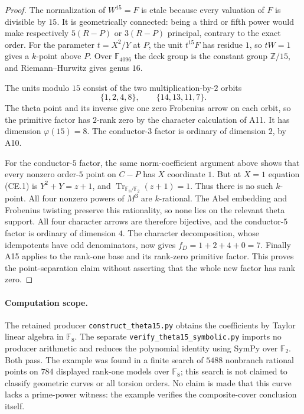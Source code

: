 \begin{proof}
The normalization of $W^{15}=F$ is etale because every valuation
of $F$ is divisible by $15$. It is geometrically connected:
being a third or fifth power would make respectively
$5(R-P)$ or $3(R-P)$ principal, contrary to the exact order.
For the parameter $t=X^2/Y$ at $P$, the unit $t^{15}F$ has residue
$1$, so $tW=1$ gives a $k$-point above $P$. Over
$\mathbb F_{4096}$ the deck group is the constant group
$\mathbb Z/15$, and Riemann--Hurwitz gives genus $16$.

The units modulo $15$ consist of the two multiplication-by-$2$
orbits
\[
                \{1,2,4,8\},\qquad\{14,13,11,7\}.
\]
The theta point and its inverse give one zero Frobenius arrow on
each orbit, so the primitive factor has $2$-rank zero by the
character calculation of A11. It has dimension $\varphi(15)=8$.
The conductor-$3$ factor is ordinary of dimension $2$, by A10.

For the conductor-$5$ factor, the same norm-coefficient argument
above shows that every nonzero order-$5$ point on $C-P$ has
$X$ coordinate $1$. But at $X=1$ equation (CE.1) is
$Y^2+Y=z+1$, and $\operatorname{Tr}_{\mathbb F_8/\mathbb F_2}(z+1)=1$.
Thus there is no such $k$-point. All four nonzero powers of
$M^3$ are $k$-rational. The Abel embedding and Frobenius twisting
preserve this rationality, so none lies on the relevant theta
support. All four character arrows are therefore bijective, and
the conductor-$5$ factor is ordinary of dimension $4$.
The character decomposition, whose idempotents have odd
denominators, now gives
$f_D=1+2+4+0=7$. Finally A15 applies to the rank-one base and its
rank-zero primitive factor. This proves the point-separation claim
without asserting that the whole new factor has rank zero.
\end{proof}

\paragraph{Computation scope.}
The retained producer \texttt{construct\_theta15.py} obtains the
coefficients by Taylor linear algebra in $\mathbb F_8$.
The separate \texttt{verify\_theta15\_symbolic.py} imports no
producer arithmetic and reduces the polynomial identity using
SymPy over $\mathbb F_2$. Both pass. The example was found in a
finite search of $5488$ nonbranch rational points on $784$
displayed rank-one models over $\mathbb F_8$; this search is not
claimed to classify geometric curves or all torsion orders.
No claim is made that this curve lacks a prime-power witness:
the example verifies the composite-cover conclusion itself.

